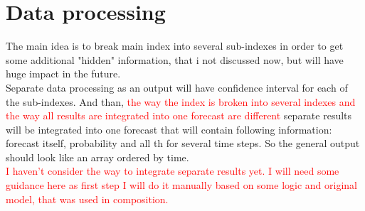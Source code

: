 \documentclass[11pt]{article}
\begin{document}
\newpage
\section{Data processing}
The main idea is to break main index into several sub-indexes in order to get some additional "hidden" information, that i not discussed now, but will have huge impact in the future.\\
Separate data processing as an output will have confidence interval for each of the sub-indexes. And than, \textcolor{red}{the way the index is broken into several indexes and the way all results are integrated into one forecast are different} separate results will be integrated into one forecast that will contain following information: forecast itself, probability and all th for several time steps. So the general output should look like an array ordered by time.\\
\textcolor{red}{I haven't consider the way to integrate separate results yet. I will need some guidance here as first step I will do it manually based on some logic and original model, that was used in composition.}
\end{document}
